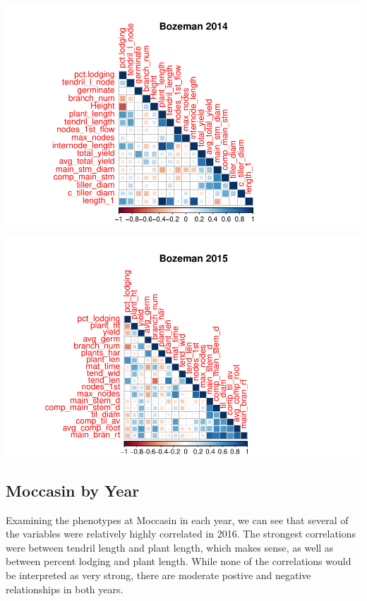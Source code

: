 \documentclass[11pt]{article}
\begin{document}
\begin{knitrout}\footnotesize
{}\color{fgcolor}

{\centering \includegraphics[width=\maxwidth]{figure/nextchunk-1} 

}




{\centering \includegraphics[width=\maxwidth]{figure/nextchunk-2} 

}



\end{knitrout}

\subsection{Moccasin by Year}
Examining the phenotypes at Moccasin in each year, we can see that several of the variables were relatively highly correlated in 2016. The strongest correlations were between tendril length and plant length, which makes sense, as well as between percent lodging and plant length. While none of the correlations would be interpreted as very strong, there are moderate postive and negative relationships in both years. 
\end{document}
